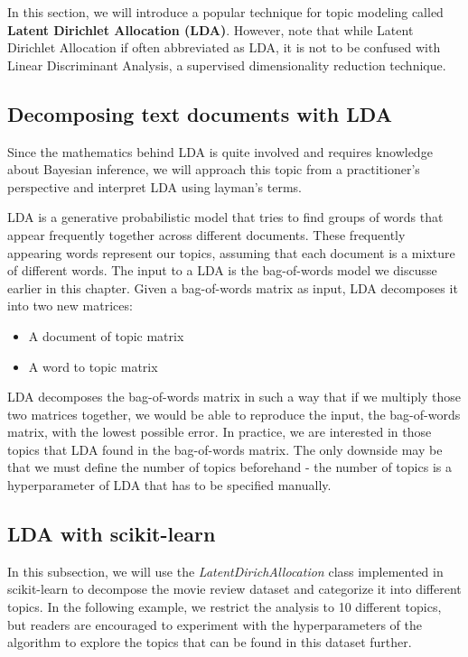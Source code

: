 \documentclass[11pt]{article}
\providecommand{\tightlist}{%
      \setlength{\itemsep}{0pt}\setlength{\parskip}{0pt}}
\begin{document}
In this section, we will introduce a popular technique for topic
modeling called \textbf{Latent Dirichlet Allocation (LDA)}. However,
note that while Latent Dirichlet Allocation if often abbreviated as LDA,
it is not to be confused with Linear Discriminant Analysis, a supervised
dimensionality reduction technique.

    \subsection{Decomposing text documents with
LDA}\label{decomposing-text-documents-with-lda}

    Since the mathematics behind LDA is quite involved and requires
knowledge about Bayesian inference, we will approach this topic from a
practitioner's perspective and interpret LDA using layman's terms.

LDA is a generative probabilistic model that tries to find groups of
words that appear frequently together across different documents. These
frequently appearing words represent our topics, assuming that each
document is a mixture of different words. The input to a LDA is the
bag-of-words model we discusse earlier in this chapter. Given a
bag-of-words matrix as input, LDA decomposes it into two new matrices:

\begin{itemize}
\tightlist
\item
  A document of topic matrix
\item
  A word to topic matrix
\end{itemize}

LDA decomposes the bag-of-words matrix in such a way that if we multiply
those two matrices together, we would be able to reproduce the input,
the bag-of-words matrix, with the lowest possible error. In practice, we
are interested in those topics that LDA found in the bag-of-words
matrix. The only downside may be that we must define the number of
topics beforehand - the number of topics is a hyperparameter of LDA that
has to be specified manually.

    \subsection{LDA with scikit-learn}\label{lda-with-scikit-learn}

    In this subsection, we will use the \emph{LatentDirichAllocation} class
implemented in scikit-learn to decompose the movie review dataset and
categorize it into different topics. In the following example, we
restrict the analysis to 10 different topics, but readers are encouraged
to experiment with the hyperparameters of the algorithm to explore the
topics that can be found in this dataset further.
\end{document}
